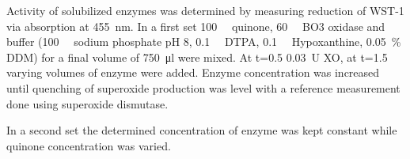 Activity of solubilized enzymes was determined by measuring reduction of WST-1
via absorption at \SI{455}{\nm}. In a first set \SI{100}{\micro\Molar} quinone,
\SI{60}{\nano\Molar} BO3 oxidase and buffer (\SI{100}{\milli\Molar} sodium
phosphate pH 8, \SI{0.1}{\milli\Molar} DTPA, \SI{0.1}{\milli\Molar}
Hypoxanthine, \SI{0.05}{\percent} DDM) for a final volume of \SI{750}{\ul} were
mixed. At t=\SI{0.5}{\min} \SI{0.03}{U} XO, at t=\SI{1.5}{\min} varying volumes
of enzyme were added. Enzyme concentration was increased until quenching of
superoxide production was level with a reference measurement done using
superoxide dismutase.

In a second set the determined concentration of enzyme was kept constant while
quinone concentration was varied.
